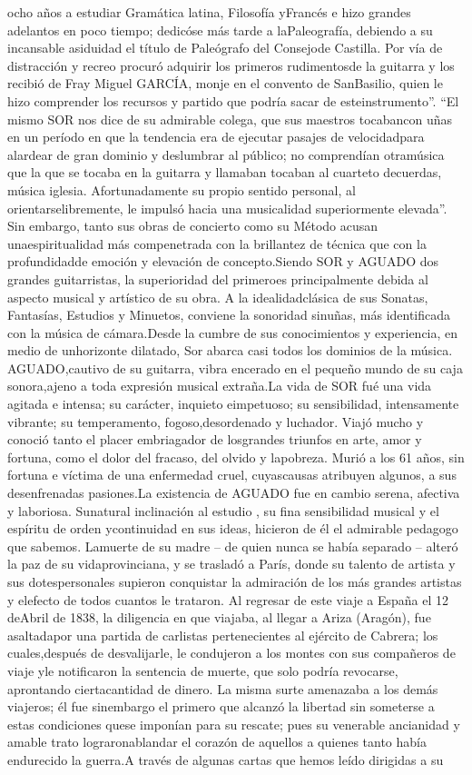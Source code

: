 \documentclass[
10pt, %
a4paper, %
oneside, %
headinclude,footinclude, %
BCOR5mm, %
]{scrartcl}
\begin{document}
{ocho años a estudiar Gramática latina, Filosofía yFrancés e hizo grandes adelantos en poco tiempo; dedicóse más tarde a laPaleografía, debiendo a su incansable asiduidad el título de Paleógrafo del Consejode Castilla. Por vía de distracción y recreo procuró adquirir los primeros rudimentosde la guitarra y los recibió de Fray Miguel GARCÍA, monje en el convento de SanBasilio, quien le hizo comprender los recursos y partido que podría sacar de esteinstrumento”. “El mismo SOR nos dice de su admirable colega, que sus maestros tocabancon uñas en un período en que la tendencia era de ejecutar pasajes de velocidadpara alardear de gran dominio y deslumbrar al público; no comprendían otramúsica que la que se tocaba en la guitarra y llamaban tocaban al cuarteto decuerdas, música iglesia. Afortunadamente su propio sentido personal, al orientarselibremente, le impulsó hacia una musicalidad superiormente elevada”. Sin embargo, tanto sus obras de concierto como su Método acusan unaespiritualidad más compenetrada con la brillantez de técnica que con la profundidadde emoción y elevación de concepto.Siendo SOR y AGUADO dos grandes guitarristas, la superioridad del primeroes principalmente debida al aspecto musical y artístico de su obra. A la idealidadclásica de sus Sonatas, Fantasías, Estudios y Minuetos, conviene la sonoridad sinuñas, más identificada con la música de cámara.Desde la cumbre de sus conocimientos y experiencia, en medio de unhorizonte dilatado, Sor abarca casi todos los dominios de la música. AGUADO,cautivo de su guitarra, vibra encerado en el pequeño mundo de su caja sonora,ajeno a toda expresión musical extraña.La vida de SOR fué una vida agitada e intensa; su carácter, inquieto eimpetuoso; su sensibilidad, intensamente vibrante; su temperamento, fogoso,desordenado y luchador. Viajó mucho y conoció tanto el placer embriagador de losgrandes triunfos en arte, amor y fortuna, como el dolor del fracaso, del olvido y lapobreza. Murió a los 61 años, sin fortuna e víctima de una enfermedad cruel, cuyascausas atribuyen algunos, a sus desenfrenadas pasiones.La existencia de AGUADO fue en cambio serena, afectiva y laboriosa. Sunatural inclinación al estudio , su fina sensibilidad musical y el espíritu de orden ycontinuidad en sus ideas, hicieron de él el admirable pedagogo que sabemos. Lamuerte de su madre – de quien nunca se había separado – alteró la paz de su vidaprovinciana, y se trasladó a París, donde su talento de artista y sus dotespersonales supieron conquistar la admiración de los más grandes artistas y elefecto de todos cuantos le trataron. Al regresar de este viaje a España el 12 deAbril de 1838, la diligencia en que viajaba, al llegar a Ariza (Aragón), fue asaltadapor una partida de carlistas pertenecientes al ejército de Cabrera; los cuales,después de desvalijarle, le condujeron a los montes con sus compañeros de viaje yle notificaron la sentencia de muerte, que solo podría revocarse, aprontando ciertacantidad de dinero. La misma surte amenazaba a los demás viajeros; él fue sinembargo el primero que alcanzó la libertad sin someterse a estas condiciones quese imponían para su rescate; pues su venerable ancianidad y amable trato lograronablandar el corazón de aquellos a quienes tanto había endurecido la guerra.A través de algunas cartas que hemos leído dirigidas a su }
\end{document}
